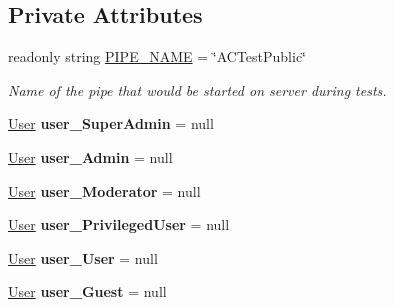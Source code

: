 \subsection*{Private Attributes}
\begin{DoxyCompactItemize}
\item 
readonly string \mbox{\hyperlink{class_authority_controller_1_1_tests_1_1_queries_a8cf9d1089864d1bdea1a5ae54c321de3}{P\+I\+P\+E\+\_\+\+N\+A\+ME}} = \char`\"{}A\+C\+Test\+Public\char`\"{}
\begin{DoxyCompactList}\small\item\em Name of the pipe that would be started on server during tests. \end{DoxyCompactList}\item 
\mbox{\label{class_authority_controller_1_1_tests_1_1_queries_a6abe89b3f3e496805cd2499bfdbb41f3}} 
\mbox{\hyperlink{class_authority_controller_1_1_data_1_1_user}{User}} {\bfseries user\+\_\+\+Super\+Admin} = null
\item 
\mbox{\label{class_authority_controller_1_1_tests_1_1_queries_abd134bc218d67f9b4e6792f9212cb1de}} 
\mbox{\hyperlink{class_authority_controller_1_1_data_1_1_user}{User}} {\bfseries user\+\_\+\+Admin} = null
\item 
\mbox{\label{class_authority_controller_1_1_tests_1_1_queries_a7e5bf8b80bc660fa128328babd36b3a2}} 
\mbox{\hyperlink{class_authority_controller_1_1_data_1_1_user}{User}} {\bfseries user\+\_\+\+Moderator} = null
\item 
\mbox{\label{class_authority_controller_1_1_tests_1_1_queries_a379bff3a24288ed5b49ef8fd09e56dff}} 
\mbox{\hyperlink{class_authority_controller_1_1_data_1_1_user}{User}} {\bfseries user\+\_\+\+Privileged\+User} = null
\item 
\mbox{\label{class_authority_controller_1_1_tests_1_1_queries_a05c0bd84370836e36ff4b2da43098c03}} 
\mbox{\hyperlink{class_authority_controller_1_1_data_1_1_user}{User}} {\bfseries user\+\_\+\+User} = null
\item 
\mbox{\label{class_authority_controller_1_1_tests_1_1_queries_adf081fb1bd4b942144bbae304c6e923d}} 
\mbox{\hyperlink{class_authority_controller_1_1_data_1_1_user}{User}} {\bfseries user\+\_\+\+Guest} = null
\end{DoxyCompactItemize}


